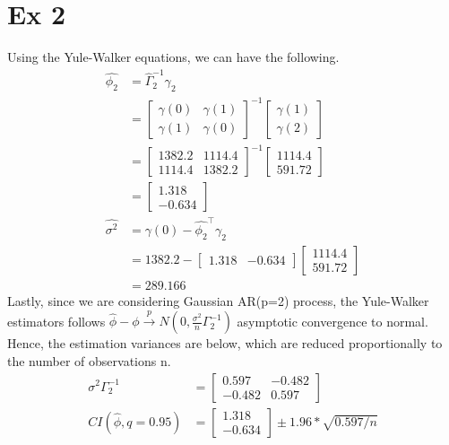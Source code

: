 \documentclass[11pt, letterpaper]{article}
\begin{document}
 \newpage
\section{Ex 2}
Using the Yule-Walker equations, we can have the following.
\begin{align*}
    \hat{\phi_2} &= \hat{\Gamma}_2^{-1} \gamma_2 \\
        &= \begin{bmatrix}\gamma(0) & \gamma(1) \\ \gamma(1) & \gamma(0)\end{bmatrix}^{-1} \begin{bmatrix}\gamma(1) \\ \gamma(2)\end{bmatrix} \\
        &= \begin{bmatrix}1382.2 & 1114.4 \\ 1114.4 & 1382.2\end{bmatrix}^{-1} \begin{bmatrix}1114.4 \\ 591.72\end{bmatrix} \\
        &= \begin{bmatrix}1.318 \\ -0.634\end{bmatrix} \\
    \hat{\sigma^2} &= \gamma(0) - \hat{\phi_2}^{\intercal} \gamma_2 \\
        &= 1382.2 - \begin{bmatrix}1.318 & -0.634\end{bmatrix} \begin{bmatrix}1114.4 \\ 591.72\end{bmatrix} \\
        &= 289.166
\end{align*}
Lastly, since we are considering Gaussian AR(p=2) process, the Yule-Walker estimators follows $\hat{\phi}-\phi \xrightarrow{p} N(0, \frac{\sigma^2}{n}\Gamma_2^{-1})$ asymptotic convergence to normal. Hence, the estimation variances are below, which are reduced proportionally to the number of observations n.
\begin{align*}
    \sigma^2\Gamma_2^{-1} &= \begin{bmatrix}0.597 & -0.482 \\ -0.482 & 0.597\end{bmatrix} \\
    CI(\hat{\phi}, q=0.95) &= \begin{bmatrix}1.318 \\ -0.634\end{bmatrix} \pm 1.96 * \sqrt{0.597/n}
\end{align*}
\end{document}
